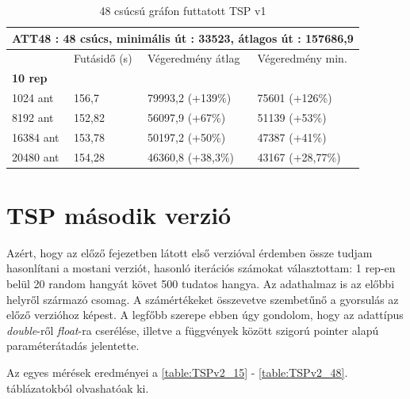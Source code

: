 \begin{table}[htbp!]
	\centering
	\begin{tabular}{|p{2cm}||p{3cm}|p{3.5cm}|p{3.5cm}|}
		\hline
		\multicolumn{4}{|c|}{ATT48 : 48 csúcs, minimális út : 33523, átlagos út : 157686,9} \\
		\hline
		& Futásidő (s) & Végeredmény átlag & Végeredmény min.\\
		\hline
		\textbf{10 rep} & & & \\
		1024 ant & 156,7 & 79993,2 (+139\%) & 75601 (+126\%) \\
		8192 ant & 152,82 & 56097,9 (+67\%) & 51139 (+53\%) \\
		16384 ant & 153,78 & 50197,2 (+50\%) & 47387 (+41\%) \\
		20480 ant & 154,28 & 46360,8 (+38,3\%) & 43167 (+28,77\%) \\
		\hline
	\end{tabular}
	\caption{48 csúcsú gráfon futtatott TSP v1}
	\label{table:TSPv1_48}
\end{table}

\newpage
\newpage

\section{TSP második verzió}
Azért, hogy az előző fejezetben látott első verzióval érdemben össze tudjam hasonlítani a mostani verziót, hasonló iterációs számokat választottam: 1 rep-en belül 20 random hangyát követ 500 tudatos hangya. Az adathalmaz is az előbbi \cite{TSPdataset} helyről származó csomag. A számértékeket összevetve szembetűnő a gyorsulás az előző verzióhoz képest. A legfőbb szerepe ebben úgy gondolom, hogy az adattípus \textit{double}-ről \textit{float}-ra cserélése, illetve a függvények között szigorú pointer alapú paraméterátadás jelentette.

Az egyes mérések eredményei a \ref{table:TSPv2_15} - \ref{table:TSPv2_48}. táblázatokból olvashatóak ki.

